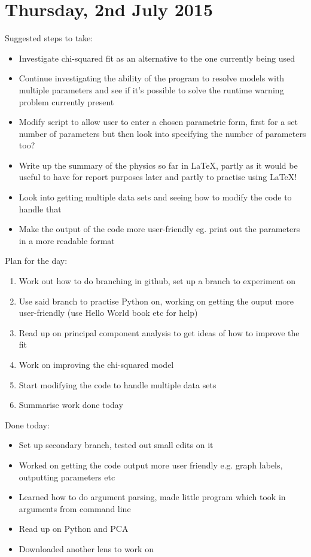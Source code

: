 \documentclass{article}
\begin{document}
\section{Thursday, 2nd July 2015}
Suggested steps to take:
\begin{itemize}
  \item Investigate chi-squared fit as an alternative to the one currently being used
  \item Continue investigating the ability of the program to resolve models with multiple parameters and see if it's possible to solve the runtime warning problem currently present
  \item Modify script to allow user to enter a chosen parametric form, first for a set number of parameters but then look into specifying the number of parameters too?
  \item Write up the summary of the physics so far in LaTeX, partly as it would be useful to have for report purposes later and partly to practise using LaTeX!
  \item Look into getting multiple data sets and seeing how to modify the code to handle that
  \item Make the output of the code more user-friendly eg. print out the parameters in a more readable format
\end{itemize}

\noindent Plan for the day:
\begin{enumerate}
  \item Work out how to do branching in github, set up a branch to experiment on
  \item Use said branch to practise Python on, working on getting the ouput more user-friendly (use Hello World book etc for help)
  \item Read up on principal component analysis to get ideas of how to improve the fit
  \item Work on improving the chi-squared model
  \item Start modifying the code to handle multiple data sets
  \item Summarise work done today
\end{enumerate}

\noindent Done today:
\begin{itemize}
  \item Set up secondary branch, tested out small edits on it
  \item Worked on getting the code output more user friendly e.g. graph labels, outputting parameters etc
  \item Learned how to do argument parsing, made little program which took in arguments from command line
  \item Read up on Python and PCA
  \item Downloaded another lens to work on
\end{itemize}\newpage
\end{document}
